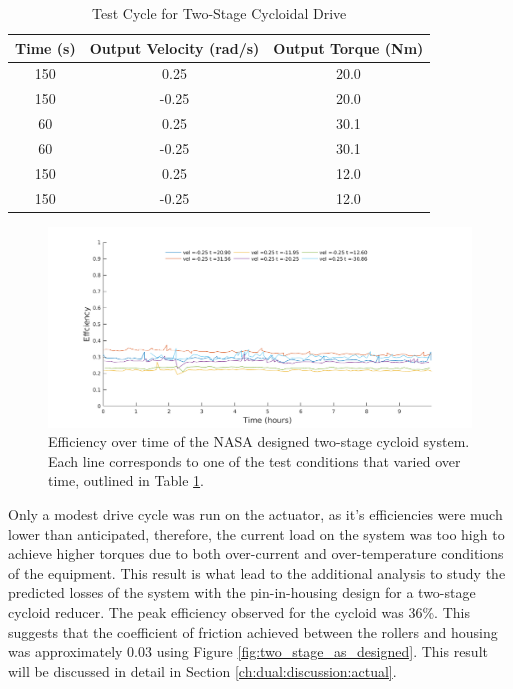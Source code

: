 \begin{table}[t]
  \vskip0.2cm
  \caption{Test Cycle for Two-Stage Cycloidal Drive}
  \label{table:two_stage_test_cycle}
  \begin{center}
    \vskip-0.2cm
    \begin{tabular}{|c||c||c|}
    \hline
    Time (s) & Output Velocity (rad/s) & Output Torque (Nm)\\
    \hline
    150 & 0.25 & 20.0\\
    \hline
    150 & -0.25 & 20.0\\
    \hline
    60 & 0.25 & 30.1\\
    \hline
    60 & -0.25 & 30.1\\
    \hline
    150 & 0.25 & 12.0\\
    \hline
    150 & -0.25 & 12.0\\
    \hline
    \end{tabular}
  \end{center}
\end{table}

\begin{figure}[!b]
	\centering
	\includegraphics[width=0.90\linewidth]{fig/two_stage_eff}
   \caption{Efficiency over time of the NASA designed two-stage cycloid system. Each line corresponds to one of the test conditions that varied over time, outlined in Table \ref{table:two_stage_test_cycle}.}
   \label{fig:two_stage_eff}
\end{figure}

Only a modest drive cycle was run on the actuator, as it's efficiencies were much lower than anticipated, therefore, the current load on the system was too high to achieve higher torques due to both over-current and over-temperature conditions of the equipment. This result is what lead to the additional analysis to study the predicted losses of the system with the pin-in-housing design for a two-stage cycloid reducer. The peak efficiency observed for the cycloid was 36\%. This suggests that the coefficient of friction achieved between the rollers and housing was approximately 0.03 using Figure \ref{fig:two_stage_as_designed}. This result will be discussed in detail in Section \ref{ch:dual:discussion:actual}.


